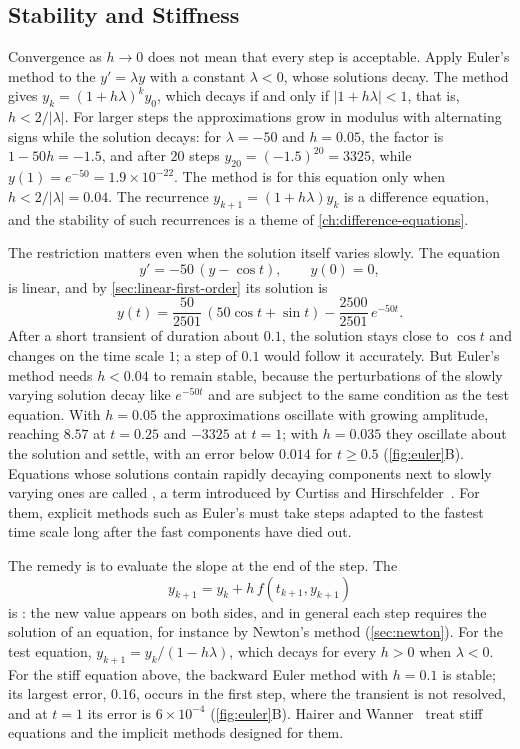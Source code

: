 \subsection{Stability and Stiffness}

Convergence as $h\to0$ does not mean that every step is acceptable. Apply Euler's method to the  $y'=\lambda y$ with a constant $\lambda<0$, whose solutions decay. The method gives $y_k=(1+h\lambda)^ky_0$, which decays if and only if $|1+h\lambda|<1$, that is, $h<2/|\lambda|$. For larger steps the approximations grow in modulus with alternating signs while the solution decays: for $\lambda=-50$ and $h=0.05$, the factor is $1-50h=-1.5$, and after $20$ steps $y_{20}=(-1.5)^{20}=3325$, while $y(1)=e^{-50}=1.9\times10^{-22}$. The method is  for this equation only when $h<2/|\lambda|=0.04$. The recurrence $y_{k+1}=(1+h\lambda)y_k$ is a difference equation, and the stability of such recurrences is a theme of \cref{ch:difference-equations}.

The restriction matters even when the solution itself varies slowly. The equation
\[
y'=-50\,(y-\cos t),\qquad y(0)=0 ,
\]
is linear, and by \cref{sec:linear-first-order} its solution is
\[
y(t)=\frac{50}{2501}\,(50\cos t+\sin t)-\frac{2500}{2501}\,e^{-50t} .
\]
After a short transient of duration about $0.1$, the solution stays close to $\cos t$ and changes on the time scale $1$; a step of $0.1$ would follow it accurately. But Euler's method needs $h<0.04$ to remain stable, because the perturbations of the slowly varying solution decay like $e^{-50t}$ and are subject to the same condition as the test equation. With $h=0.05$ the approximations oscillate with growing amplitude, reaching $8.57$ at $t=0.25$ and $-3325$ at $t=1$; with $h=0.035$ they oscillate about the solution and settle, with an error below $0.014$ for $t\ge0.5$ (\cref{fig:euler}B). Equations whose solutions contain rapidly decaying components next to slowly varying ones are called , a term introduced by Curtiss and Hirschfelder~\cite{curtiss1952}. For them, explicit methods such as Euler's must take steps adapted to the fastest time scale long after the fast components have died out.

The remedy is to evaluate the slope at the end of the step. The 
\[
y_{k+1}=y_k+h\,f(t_{k+1},y_{k+1})
\]
is : the new value appears on both sides, and in general each step requires the solution of an equation, for instance by Newton's method (\cref{sec:newton}). For the test equation, $y_{k+1}=y_k/(1-h\lambda)$, which decays for every $h>0$ when $\lambda<0$. For the stiff equation above, the backward Euler method with $h=0.1$ is stable; its largest error, $0.16$, occurs in the first step, where the transient is not resolved, and at $t=1$ its error is $6\times10^{-4}$ (\cref{fig:euler}B). Hairer and Wanner~\cite{hairer1996stiff} treat stiff equations and the implicit methods designed for them.

